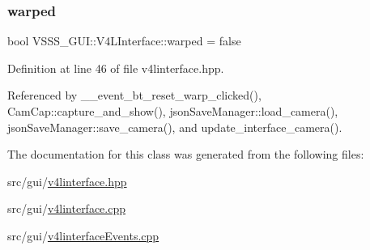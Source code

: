 \subsubsection{\texorpdfstring{warped}{warped}}
{\footnotesize\ttfamily bool V\+S\+S\+S\+\_\+\+G\+U\+I\+::\+V4\+L\+Interface\+::warped = false}



Definition at line 46 of file v4linterface.\+hpp.



Referenced by \+\_\+\+\_\+event\+\_\+bt\+\_\+reset\+\_\+warp\+\_\+clicked(), Cam\+Cap\+::capture\+\_\+and\+\_\+show(), json\+Save\+Manager\+::load\+\_\+camera(), json\+Save\+Manager\+::save\+\_\+camera(), and update\+\_\+interface\+\_\+camera().



The documentation for this class was generated from the following files\+:\begin{DoxyCompactItemize}
\item 
src/gui/\hyperlink{v4linterface_8hpp}{v4linterface.\+hpp}\item 
src/gui/\hyperlink{v4linterface_8cpp}{v4linterface.\+cpp}\item 
src/gui/\hyperlink{v4linterface_events_8cpp}{v4linterface\+Events.\+cpp}\end{DoxyCompactItemize}
